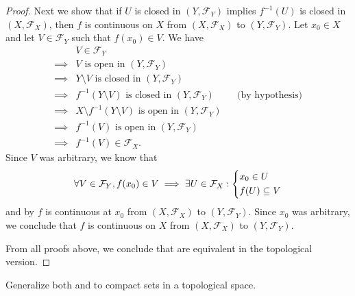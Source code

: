 \begin{proof}
  Next we show that if \(U\) is closed in \((Y, \mathcal{F}_Y)\) implies \(f^{-1}(U)\) is closed in \((X, \mathcal{F}_X)\), then \(f\) is continuous on \(X\) from \((X, \mathcal{F}_X)\) to \((Y, \mathcal{F}_Y)\).
  Let \(x_0 \in X\) and let \(V \in \mathcal{F}_Y\) such that \(f(x_0) \in V\).
  We have
  \begin{align*}
             & V \in \mathcal{F}_Y                                                                                  \\
    \implies & V \text{ is open in } (Y, \mathcal{F}_Y)                                                             \\
    \implies & Y \setminus V \text{ is closed in } (Y, \mathcal{F}_Y)                                               \\
    \implies & f^{-1}(Y \setminus V) \text{ is closed in } (Y, \mathcal{F}_Y)           &  & \text{(by hypothesis)} \\
    \implies & X \setminus f^{-1}(Y \setminus V) \text{ is open in } (Y, \mathcal{F}_Y)                             \\
    \implies & f^{-1}(V) \text{ is open in } (Y, \mathcal{F}_Y)                                                     \\
    \implies & f^{-1}(V) \in \mathcal{F}_X.
  \end{align*}
  Since \(V\) was arbitrary, we know that
  \[
    \forall V \in \mathcal{F}_Y, f(x_0) \in V \implies \exists U \in \mathcal{F}_X : \begin{dcases}
      x_0 \in U \\
      f(U) \subseteq V
    \end{dcases}
  \]
  and by  \(f\) is continuous at \(x_0\) from \((X, \mathcal{F}_X)\) to \((Y, \mathcal{F}_Y)\).
  Since \(x_0\) was arbitrary, we conclude that \(f\) is continuous on \(X\) from \((X, \mathcal{F}_X)\) to \((Y, \mathcal{F}_Y)\).

  From all proofs above, we conclude that  are equivalent in the topological version.
\end{proof}

\begin{ex}\label{ii:ex:2.5.17}
  Generalize both  and  to compact sets in a topological space.
\end{ex}

